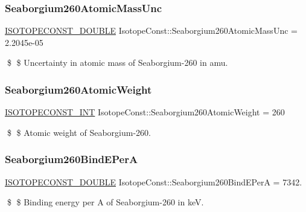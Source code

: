\subsubsection{\texorpdfstring{Seaborgium260\+Atomic\+Mass\+Unc}{Seaborgium260AtomicMassUnc}}
{\footnotesize\ttfamily \mbox{\hyperlink{group___isotope_const-_macros_ga8f45a7272ce02c0b4c65c44636ed719a}{I\+S\+O\+T\+O\+P\+E\+C\+O\+N\+S\+T\+\_\+\+D\+O\+U\+B\+LE}} Isotope\+Const\+::\+Seaborgium260\+Atomic\+Mass\+Unc = 2.\+2045e-\/05}

\$ \$ Uncertainty in atomic mass of Seaborgium-\/260 in amu. \mbox{\label{group___isotope_const-_seaborgium-_sg260_ga6f1a0d2fbae3c9672de856430f3c295e}} 
\subsubsection{\texorpdfstring{Seaborgium260\+Atomic\+Weight}{Seaborgium260AtomicWeight}}
{\footnotesize\ttfamily \mbox{\hyperlink{group___isotope_const-_macros_ga5f18360b3e99483a35c32d789e62621c}{I\+S\+O\+T\+O\+P\+E\+C\+O\+N\+S\+T\+\_\+\+I\+NT}} Isotope\+Const\+::\+Seaborgium260\+Atomic\+Weight = 260}

\$ \$ Atomic weight of Seaborgium-\/260. \mbox{\label{group___isotope_const-_seaborgium-_sg260_ga3949f7849ac7db0bc5e20182d7c4aa4c}} 
\subsubsection{\texorpdfstring{Seaborgium260\+Bind\+E\+PerA}{Seaborgium260BindEPerA}}
{\footnotesize\ttfamily \mbox{\hyperlink{group___isotope_const-_macros_ga8f45a7272ce02c0b4c65c44636ed719a}{I\+S\+O\+T\+O\+P\+E\+C\+O\+N\+S\+T\+\_\+\+D\+O\+U\+B\+LE}} Isotope\+Const\+::\+Seaborgium260\+Bind\+E\+PerA = 7342.}

\$ \$ Binding energy per A of Seaborgium-\/260 in keV. \mbox{\label{group___isotope_const-_seaborgium-_sg260_ga263ff23588512644a8521b1bc86b767e}} 
